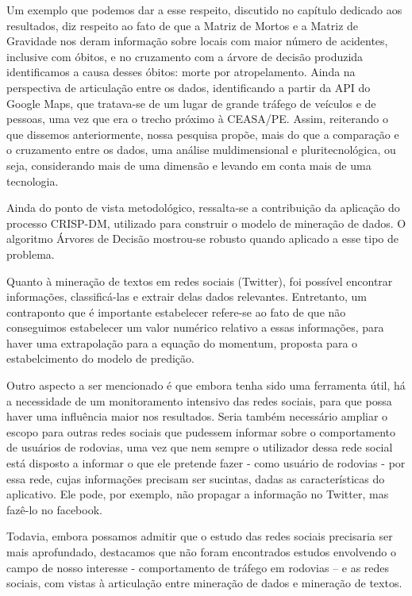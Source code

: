 Um exemplo que podemos dar a esse respeito, discutido no capítulo dedicado aos resultados, diz respeito ao fato de que a Matriz de Mortos e a Matriz de Gravidade nos deram informação sobre locais com maior número de acidentes, inclusive com óbitos, e no cruzamento com a árvore de decisão produzida identificamos a causa desses óbitos: morte por atropelamento. Ainda na perspectiva de articulação entre os dados, identificando a partir da API do Google Maps, que tratava-se de um lugar de grande tráfego de veículos e de pessoas, uma vez que era o trecho próximo à CEASA/PE. Assim, reiterando o que dissemos anteriormente, nossa pesquisa propõe, mais do que a comparação e o cruzamento entre os dados, uma análise muldimensional e pluritecnológica, ou seja, considerando mais de uma dimensão e levando em conta mais de uma tecnologia. 

Ainda do ponto de vista metodológico, ressalta-se a contribuição da aplicação do processo CRISP-DM,
utilizado para construir o modelo de mineração de dados. 
O algoritmo Árvores de Decisão mostrou-se robusto quando aplicado a esse tipo de problema.

Quanto à mineração de textos em redes sociais (Twitter), foi possível encontrar informações, classificá-las e extrair delas dados relevantes. Entretanto, um contraponto que é importante estabelecer refere-se ao fato de que não conseguimos estabelecer um valor numérico relativo a essas informações, para haver uma extrapolação para a equação do momentum, proposta para o estabelcimento do modelo de predição. 

Outro aspecto a ser mencionado é que embora tenha sido uma ferramenta útil, há a necessidade de um monitoramento intensivo das redes sociais, para que possa haver uma influência maior nos resultados. Seria também necessário ampliar o escopo para outras redes sociais que pudessem informar sobre o comportamento de usuários de rodovias, uma vez que nem sempre o utilizador dessa rede social está disposto a informar o que ele pretende fazer - como usuário de rodovias - por essa rede, cujas informações precisam ser sucintas, dadas as características do aplicativo. Ele pode, por exemplo, não propagar a informação no Twitter, mas fazê-lo no facebook.

Todavia, embora possamos admitir que o estudo das redes sociais precisaria ser mais aprofundado, destacamos que não foram encontrados estudos envolvendo o campo de nosso interesse - comportamento de tráfego em rodovias – e as redes sociais, com vistas à articulação entre mineração de dados e mineração de textos.  

